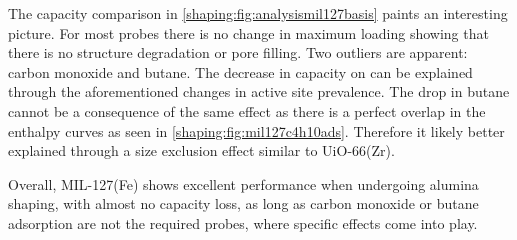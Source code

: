 The capacity comparison in \autoref{shaping:fig:analysismil127basis}
paints an interesting picture. For most probes there is no change in
maximum loading showing that there is no structure degradation or
pore filling. Two outliers are apparent: carbon monoxide and
butane. The decrease in capacity on  can be explained through the
aforementioned changes in active site prevalence.
The drop in butane cannot be a consequence of the same effect
as there is a perfect overlap in the enthalpy curves as seen in
\autoref{shaping:fig:mil127c4h10ads}.
Therefore it likely better explained through a size exclusion
effect similar to UiO-66(Zr).

Overall, MIL-127(Fe) shows excellent performance when undergoing
alumina shaping, with almost no capacity loss, as long as
carbon monoxide or butane adsorption are not the required probes,
where specific effects come into play.

